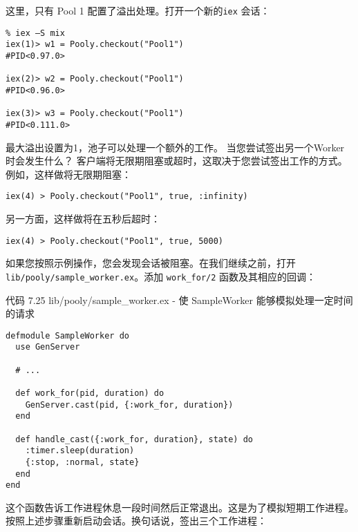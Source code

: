 这里，只有 Pool 1 配置了溢出处理。打开一个新的\texttt{iex} 会话：

\begin{code}{}
\begin{verbatim}
% iex –S mix
iex(1)> w1 = Pooly.checkout("Pool1")
#PID<0.97.0>

iex(2)> w2 = Pooly.checkout("Pool1")
#PID<0.96.0>

iex(3)> w3 = Pooly.checkout("Pool1")
#PID<0.111.0>
\end{verbatim}
\end{code}

最大溢出设置为1，池子可以处理一个额外的工作。
当您尝试签出另一个Worker时会发生什么？
客户端将无限期阻塞或超时，这取决于您尝试签出工作的方式。例如，这样做将无限期阻塞：

\begin{code}{}
\begin{verbatim}
iex(4) > Pooly.checkout("Pool1", true, :infinity)
\end{verbatim}
\end{code}

另一方面，这样做将在五秒后超时：

\begin{code}{}
\begin{verbatim}
iex(4) > Pooly.checkout("Pool1", true, 5000)
\end{verbatim}
\end{code}

如果您按照示例操作，您会发现会话被阻塞。在我们继续之前，打开
\texttt{lib/pooly/sample\_worker.ex}。添加
\texttt{work\_for/2} 函数及其相应的回调：

代码 7.25 lib/pooly/sample\_worker.ex - 使 SampleWorker
能够模拟处理一定时间的请求

\begin{code}{}
\begin{verbatim}
defmodule SampleWorker do
  use GenServer

  # ...

  def work_for(pid, duration) do
    GenServer.cast(pid, {:work_for, duration})
  end

  def handle_cast({:work_for, duration}, state) do
    :timer.sleep(duration)
    {:stop, :normal, state}
  end
end
\end{verbatim}
\end{code}

这个函数告诉工作进程休息一段时间然后正常退出。这是为了模拟短期工作进程。按照上述步骤重新启动会话。换句话说，签出三个工作进程：

